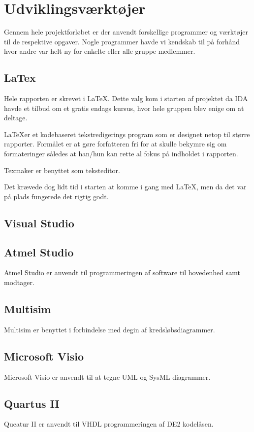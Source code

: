 \chapter{Udviklingsværktøjer}
Gennem hele projektforløbet er der anvendt forskellige programmer og værktøjer til de respektive opgaver. Nogle programmer havde vi kendskab til på forhånd hvor andre var helt ny for enkelte eller alle gruppe medlemmer.

\section{LaTex}
Hele rapporten er skrevet i \LaTeX. Dette valg kom i starten af projektet da IDA havde et tilbud om et gratis endags kursus, hvor hele gruppen blev enige om at deltage. 

\LaTeX er et kodebaseret tekstredigerings program som er designet netop til større rapporter. Formålet er at gøre forfatteren fri for at skulle bekymre sig om formateringer således at han/hun kan rette al fokus på indholdet i rapporten.

Texmaker er benyttet som teksteditor.

Det krævede dog lidt tid i starten at komme i gang med \LaTeX, men da det var på plads fungerede det rigtig godt. 

\section{Visual Studio}

\section{Atmel Studio}
Atmel Studio er anvendt til programmeringen af software til hovedenhed samt modtager.

\section{Multisim}
Multisim er benyttet i forbindelse med degin af kredsløbsdiagrammer. 

\section{Microsoft Visio} %
Microsoft Visio er anvendt til at tegne UML og SysML diagrammer.

\section{Quartus II}
Queatur II er anvendt til VHDL programmeringen af DE2 kodelåsen.

